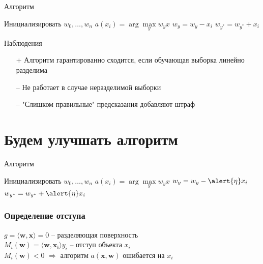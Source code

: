 \documentclass[10pt]{beamer}
\begin{document}
\begin{frame}{Алгоритм}
	\begin{algorithmic}[1]
            \State Инициализировать ${w_0, \dots, w_n}$
                 \State $a(x_i) = \arg\max\limits_{y} w_y x$                 
                   \State $w_y = w_y - x_i$
                   \State $w_{y^{*}} = w_{y^{*}} + x_i$
                 \EndIf  
               \EndFor
           	\EndRepeat
        \EndFunction
    \end{algorithmic}
\end{frame}

\begin{frame} {Наблюдения}
    \begin{itemize} [<+->]
      \item[+] Алгоритм гарантированно сходится, если обучающая выборка линейно разделима
      \bigbreak
      \item[--] Не работает в случае неразделимой выборки 
      \item[--] "Слишком правильные" предсказания добавляют штраф       
    \end{itemize}
\end{frame}

\section{Будем улучшать алгоритм}

\begin{frame}{Алгоритм}
	\begin{algorithmic}[1]
            \State Инициализировать ${w_0, \dots, w_n}$
                 \State $a(x_i) = \arg\max\limits_{y} w_y x$                 
                   \State $w_y = w_y - \alert{\eta} x_i$
                   \State $w_{y^{*}} = w_{y^{*}} + \alert{\eta} x_i$
                 \EndIf  
               \EndFor
           	\EndRepeat
        \EndFunction
    \end{algorithmic}
\end{frame}

\begin{frame}\frametitle{Определение отступа}
	${g = \langle \mathbf{w}, \mathbf{x}\rangle = 0}$ -- разделяющая поверхность\\
	$M_i(\mathbf{w}) = \langle \mathbf{w}, \mathbf{x_i}\rangle y_i$ -- отступ объекта $x_i$\\
	${M_i(\mathbf{w})<0}$ $\Rightarrow$ алгоритм $a(\mathbf{x},\mathbf{w})$ ошибается на $x_i$
\end{frame}
\end{document}
